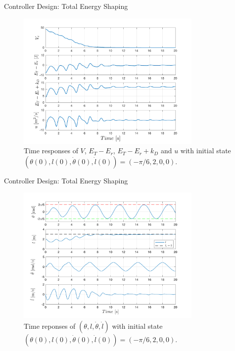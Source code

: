 \documentclass[10pt]{beamer}
\begin{document}
  \begin{frame}{Controller Design: Total Energy Shaping}
    \begin{figure}
      \caption{Time responses of $V$, $E_T-E_r$, $E_T-E_r+k_D$ and $u$
        with initial state
        $(\theta(0),l(0),\dot{\theta}(0),\dot{l}(0)) = (-\pi/6,2,0,0)$.}
      \vspace{-0.3cm}
      \includegraphics[width=0.8\textwidth]{images/total_1b.pdf}
    \end{figure}
  \end{frame}

  \begin{frame}{Controller Design: Total Energy Shaping}
    \begin{figure}
      \caption{Time reponses of $(\theta,l,\dot{\theta},\dot{l})$ with initial
        state $(\theta(0),l(0),\dot{\theta}(0),\dot{l}(0))=(-\pi/6,2,0,0)$.}
      \vspace{-0.3cm}
      \includegraphics[width=0.8\textwidth]{images/total_2b.pdf}
    \end{figure}
  \end{frame}
\end{document}
